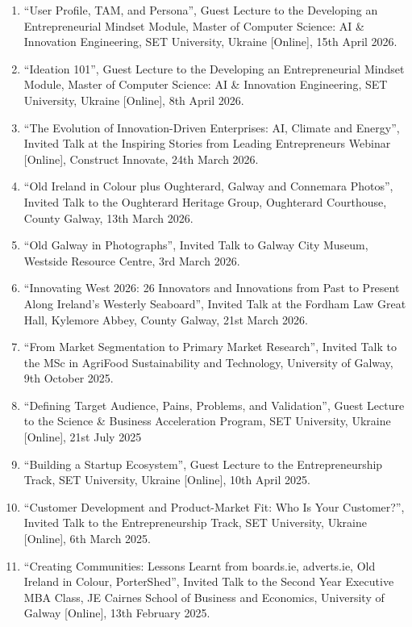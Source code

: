 \documentclass[10pt,a4paper]{res} %
\begin{document}
\begin{resume}
\begin{enumerate} \itemsep -2pt
\item ``User Profile, TAM, and Persona'', Guest Lecture to the Developing an Entrepreneurial Mindset Module, Master of Computer Science: AI \& Innovation Engineering, SET University, Ukraine [Online], 15th April 2026.
\item ``Ideation 101'', Guest Lecture to the Developing an Entrepreneurial Mindset Module, Master of Computer Science: AI \& Innovation Engineering, SET University, Ukraine [Online], 8th April 2026.
\item ``The Evolution of Innovation-Driven Enterprises: AI, Climate and Energy'', Invited Talk at the Inspiring Stories from Leading Entrepreneurs Webinar [Online], Construct Innovate, 24th March 2026.
\item ``Old Ireland in Colour plus Oughterard, Galway and Connemara Photos'', Invited Talk to the Oughterard Heritage Group, Oughterard Courthouse, County Galway, 13th March 2026.
\item ``Old Galway in Photographs'', Invited Talk to Galway City Museum, Westside Resource Centre, 3rd March 2026.
\item ``Innovating West 2026: 26 Innovators and Innovations from Past to Present Along Ireland's Westerly Seaboard'', Invited Talk at the Fordham Law Great Hall, Kylemore Abbey, County Galway, 21st March 2026.
\item ``From Market Segmentation to Primary Market Research'', Invited Talk to the MSc in AgriFood Sustainability and Technology, University of Galway, 9th October 2025.
\item ``Defining Target Audience, Pains, Problems, and Validation'', Guest Lecture to the Science \& Business Acceleration Program, SET University, Ukraine [Online], 21st July 2025
\item ``Building a Startup Ecosystem'', Guest Lecture to the Entrepreneurship Track, SET University, Ukraine [Online], 10th April 2025.
\item ``Customer Development and Product-Market Fit: Who Is Your Customer?'', Invited Talk to the Entrepreneurship Track, SET University, Ukraine [Online], 6th March 2025.
\item ``Creating Communities: Lessons Learnt from boards.ie, adverts.ie, Old Ireland in Colour, PorterShed'', Invited Talk to the Second Year Executive MBA Class, JE Cairnes School of Business and Economics, University of Galway [Online], 13th February 2025.

\end{enumerate}
\end{resume}
\end{document}
